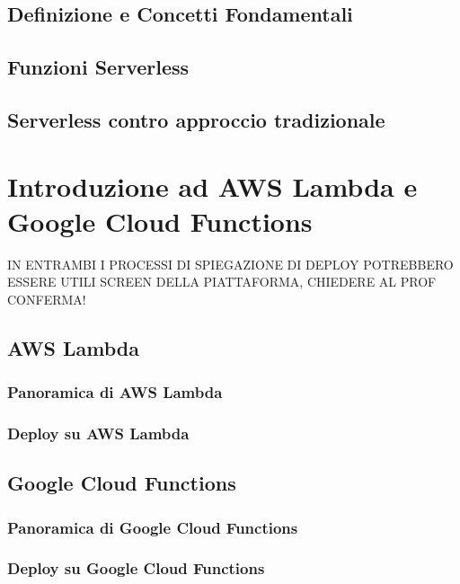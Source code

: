 \documentclass[12pt,a4paper,twoside]{book}
\begin{document}
\section{Definizione e Concetti Fondamentali}


\section{Funzioni Serverless}


\section{Serverless contro approccio tradizionale}


\chapter{Introduzione ad AWS Lambda e Google Cloud Functions}
IN ENTRAMBI I PROCESSI DI SPIEGAZIONE DI DEPLOY POTREBBERO ESSERE UTILI SCREEN DELLA PIATTAFORMA, CHIEDERE AL PROF CONFERMA!




\section{AWS Lambda}
\subsection{Panoramica di AWS Lambda}


\subsection{Deploy su AWS Lambda}


\section{Google Cloud Functions}
\subsection{Panoramica di Google Cloud Functions}


\subsection{Deploy su Google Cloud Functions}

\end{document}

